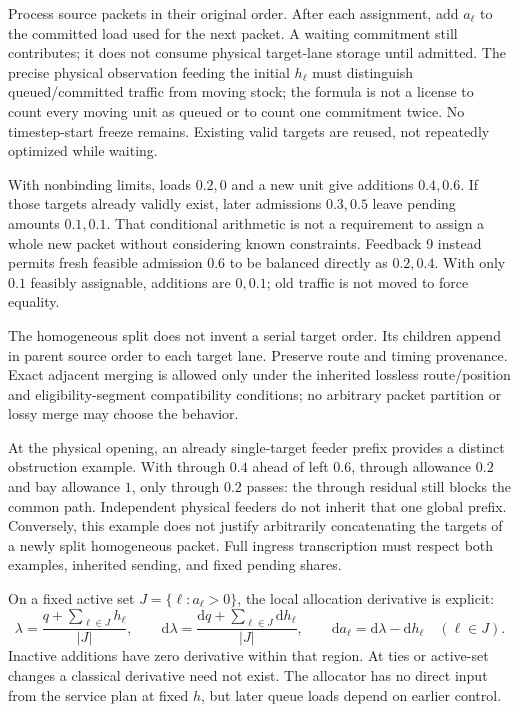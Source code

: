 \documentclass[11pt]{article}
\newcommand{\dd}{\mathrm d}
\begin{document}
Process source packets in their original order. After each assignment, add $a_\ell$ to the committed load used for the next packet. A waiting commitment still contributes; it does not consume physical target-lane storage until admitted. The precise physical observation feeding the initial $h_\ell$ must distinguish queued/committed traffic from moving stock; the formula is not a license to count every moving unit as queued or to count one commitment twice. No timestep-start freeze remains. Existing valid targets are reused, not repeatedly optimized while waiting.

With nonbinding limits, loads $0.2,0$ and a new unit give additions $0.4,0.6$. If those targets already validly exist, later admissions $0.3,0.5$ leave pending amounts $0.1,0.1$. That conditional arithmetic is not a requirement to assign a whole new packet without considering known constraints. Feedback 9 instead permits fresh feasible admission $0.6$ to be balanced directly as $0.2,0.4$. With only $0.1$ feasibly assignable, additions are $0,0.1$; old traffic is not moved to force equality.

The homogeneous split does not invent a serial target order. Its children append in parent source order to each target lane. Preserve route and timing provenance. Exact adjacent merging is allowed only under the inherited lossless route/position and eligibility-segment compatibility conditions; no arbitrary packet partition or lossy merge may choose the behavior.

At the physical opening, an already single-target feeder prefix provides a distinct obstruction example. With through $0.4$ ahead of left $0.6$, through allowance $0.2$ and bay allowance $1$, only through $0.2$ passes: the through residual still blocks the common path. Independent physical feeders do not inherit that one global prefix. Conversely, this example does not justify arbitrarily concatenating the targets of a newly split homogeneous packet. Full ingress transcription must respect both examples, inherited sending, and fixed pending shares.

On a fixed active set $J=\{\ell:a_\ell>0\}$, the local allocation derivative is explicit:
\begin{equation}
 \lambda=\frac{q+\sum_{\ell\in J}h_\ell}{|J|},\qquad
 \dd\lambda=\frac{\dd q+\sum_{\ell\in J}\dd h_\ell}{|J|},\qquad
 \dd a_\ell=\dd\lambda-\dd h_\ell\quad(\ell\in J).
 \label{eq:allocation-derivative}
\end{equation}
Inactive additions have zero derivative within that region. At ties or active-set changes a classical derivative need not exist. The allocator has no direct input from the service plan at fixed $h$, but later queue loads depend on earlier control.
\end{document}
